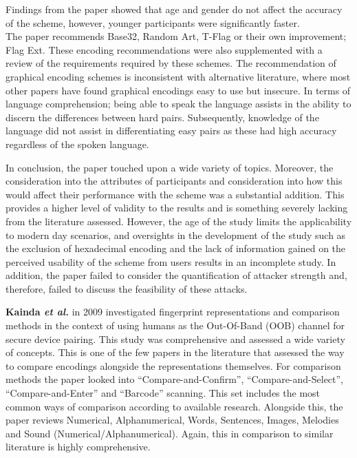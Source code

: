 Findings from the paper showed that age and gender do not affect the accuracy of the scheme, however, younger participants were significantly faster. \\
The paper recommends Base32, Random Art, T-Flag or their own improvement; Flag Ext. These encoding recommendations were also supplemented with a review of the requirements required by these schemes. The recommendation of graphical encoding schemes is inconsistent with alternative literature, where most other papers have found graphical encodings easy to use but insecure.
In terms of language comprehension; being able to speak the language assists in the ability to discern the differences between hard pairs. Subsequently, knowledge of the language did not assist in differentiating easy pairs as these had high accuracy regardless of the spoken language.

In conclusion, the paper touched upon a wide variety of topics. Moreover, the consideration into the attributes of participants and consideration into how this would affect their performance with the scheme was a substantial addition. This provides a higher level of validity to the results and is something severely lacking from the literature assessed. However, the age of the study limits the applicability to modern day scenarios, and oversights in the development of the study such as the exclusion of hexadecimal encoding and the lack of information gained on the perceived usability of the scheme from users results in an incomplete study. In addition, the paper failed to consider the quantification of attacker strength and, therefore, failed to discuss the feasibility of these attacks.

\textbf{Kainda \textit{et al.}}\cite{kainda2009usability} in 2009 investigated fingerprint representations and comparison methods in the context of using humans as the Out-Of-Band (OOB) channel for secure device pairing. This study was comprehensive and assessed a wide variety of concepts. This is one of the few papers in the literature that assessed the way to compare encodings alongside the representations themselves. For comparison methods the paper looked into ``Compare-and-Confirm'', ``Compare-and-Select'', ``Compare-and-Enter'' and ``Barcode'' scanning. This set includes the most common ways of comparison according to available research. Alongside this, the paper reviews Numerical, Alphanumerical, Words, Sentences, Images, Melodies and Sound (Numerical/Alphanumerical). Again, this in comparison to similar literature is highly comprehensive.

